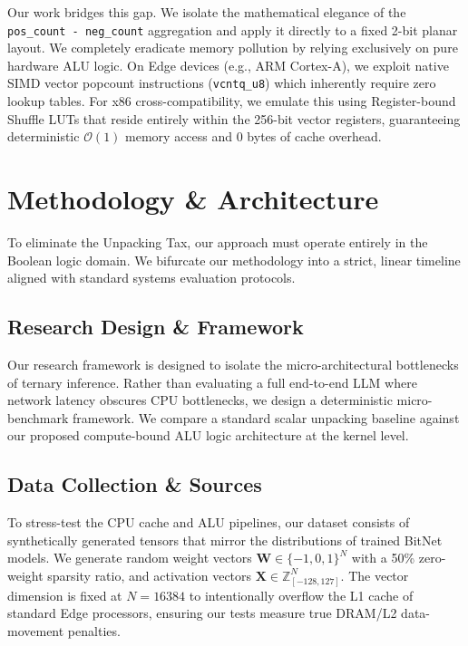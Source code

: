 \documentclass[10pt, conference]{IEEEtran}
\begin{document}
Our work bridges this gap. We isolate the mathematical elegance of the \texttt{pos\_count - neg\_count} aggregation and apply it directly to a fixed 2-bit planar layout. We completely eradicate memory pollution by relying exclusively on pure hardware ALU logic. On Edge devices (e.g., ARM Cortex-A), we exploit native SIMD vector popcount instructions (\texttt{vcntq\_u8}) which inherently require zero lookup tables. For x86 cross-compatibility, we emulate this using Register-bound Shuffle LUTs that reside entirely within the 256-bit vector registers, guaranteeing deterministic $\mathcal{O}(1)$ memory access and 0 bytes of cache overhead.







\section{Methodology \& Architecture}
To eliminate the Unpacking Tax, our approach must operate entirely in the Boolean logic domain. We bifurcate our methodology into a strict, linear timeline aligned with standard systems evaluation protocols.

\subsection{Research Design \& Framework}
Our research framework is designed to isolate the micro-architectural bottlenecks of ternary inference. Rather than evaluating a full end-to-end LLM where network latency obscures CPU bottlenecks, we design a deterministic micro-benchmark framework. We compare a standard scalar unpacking baseline against our proposed compute-bound ALU logic architecture at the kernel level.

\subsection{Data Collection \& Sources}
To stress-test the CPU cache and ALU pipelines, our dataset consists of synthetically generated tensors that mirror the distributions of trained BitNet models. We generate random weight vectors $\mathbf{W} \in \{-1, 0, 1\}^N$ with a 50\% zero-weight sparsity ratio, and activation vectors $\mathbf{X} \in \mathbb{Z}^N_{[-128, 127]}$. The vector dimension is fixed at $N=16384$ to intentionally overflow the L1 cache of standard Edge processors, ensuring our tests measure true DRAM/L2 data-movement penalties.
\end{document}
